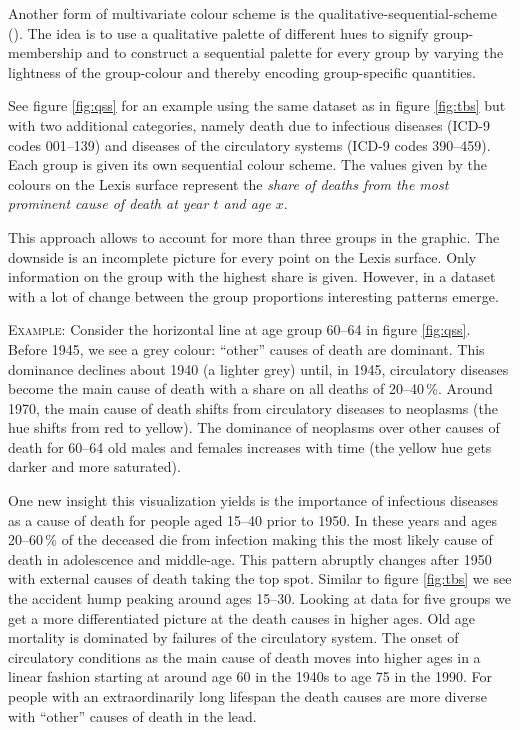 \documentclass{scrartcl}
\begin{document}
Another form of multivariate colour scheme is the qualitative-sequential-scheme (\cite{Brewer1994a}). The idea is to use a qualitative palette of different hues to signify group-membership and to construct a sequential palette for every group by varying the lightness of the group-colour and thereby encoding group-specific quantities.

See figure \ref{fig:qss} for an example using the same dataset as in figure \ref{fig:tbs} but with two additional categories, namely death due to infectious diseases (ICD-9 codes 001--139) and diseases of the circulatory systems (ICD-9 codes 390--459). Each group is given its own sequential colour scheme. The values given by the colours on the Lexis surface represent the \emph{share of deaths from the most prominent cause of death at year $t$ and age $x$}.

This approach allows to account for more than three groups in the graphic. The downside is an incomplete picture for every point on the Lexis surface. Only information on the group with the highest share is given. However, in a dataset with a lot of change between the group proportions interesting patterns emerge.

\textsc{Example:} Consider the horizontal line at age group 60--64 in figure \ref{fig:qss}. Before 1945, we see a grey colour: \enquote{other} causes of death are dominant. This dominance declines about 1940 (a lighter grey) until, in 1945, circulatory diseases become the main cause of death with a share on all deaths of 20--40\,\%. Around 1970, the main cause of death shifts from circulatory diseases to neoplasms (the hue shifts from red to yellow). The dominance of neoplasms over other causes of death for 60--64 old males and females increases with time (the yellow hue gets darker and more saturated).

One new insight this visualization yields is the importance of infectious diseases as a cause of death for people aged 15--40 prior to 1950. In these years and ages 20--60\,\% of the deceased die from infection making this the most likely cause of death in adolescence and middle-age. This pattern abruptly changes after 1950 with external causes of death taking the top spot. Similar to figure \ref{fig:tbs} we see the accident hump peaking around ages 15--30. Looking at data for five groups we get a more differentiated picture at the death causes in higher ages. Old age mortality is dominated by failures of the circulatory system. The onset of circulatory conditions as the main cause of death moves into higher ages in a linear fashion starting at around age 60 in the 1940s to age 75 in the 1990. For people with an extraordinarily long lifespan the death causes are more diverse with \enquote{other} causes of death in the lead.
\end{document}
